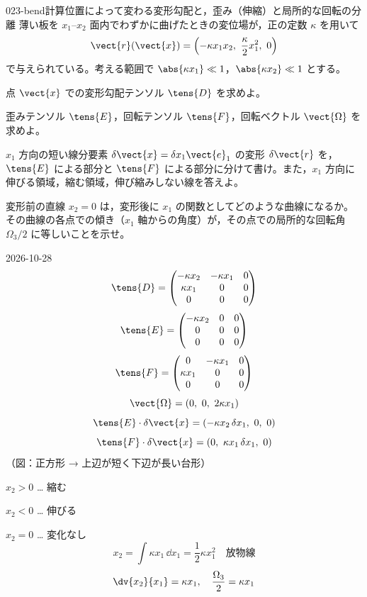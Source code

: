 \documentclass[uplatex,dvipdfmx,a4paper,11pt]{jsarticle}
\begin{document}
\begin{mondai}{023-bend}{計算}{位置によって変わる変形勾配と，歪み（伸縮）と局所的な回転の分離}
薄い板を $x_1$--$x_2$ 面内でわずかに曲げたときの変位場が，正の定数 $\kappa$ を用いて
  \[ \vect{r}(\vect{x})=\left(-\kappa x_1x_2,\ \frac{\kappa}{2}x_1^{2},\ 0\right) \]
  で与えられている。考える範囲で $\abs{\kappa x_1}\ll1$，$\abs{\kappa x_2}\ll1$ とする。
  \begin{shoumon}
    \item 点 $\vect{x}$ での変形勾配テンソル $\tens{D}$ を求めよ。
    \item 歪みテンソル $\tens{E}$，回転テンソル $\tens{F}$，回転ベクトル $\vect{\Omega}$ を求めよ。
    \item $x_1$ 方向の短い線分要素 $\delta\vect{x}=\delta x_1\vect{e}_1$ の変形 $\delta\vect{r}$ を，$\tens{E}$ による部分と $\tens{F}$ による部分に分けて書け。また，$x_1$ 方向に伸びる領域，縮む領域，伸び縮みしない線を答えよ。
    \item 変形前の直線 $x_2=0$ は，変形後に $x_1$ の関数としてどのような曲線になるか。その曲線の各点での傾き（$x_1$ 軸からの角度）が，その点での局所的な回転角 $\Omega_3/2$ に等しいことを示せ。
  \end{shoumon}
\begin{kotaeutsushi}{2026-10-28}
\[ \tens{D}=\begin{pmatrix}-\kappa x_{2}&-\kappa x_{1}&0\\\kappa x_{1}&0&0\\0&0&0\end{pmatrix} \]
\[ \tens{E}=\begin{pmatrix}-\kappa x_{2}&0&0\\0&0&0\\0&0&0\end{pmatrix} \]
\[ \tens{F}=\begin{pmatrix}0&-\kappa x_{1}&0\\\kappa x_{1}&0&0\\0&0&0\end{pmatrix} \]
\[ \vect{\Omega}=(0,\ 0,\ 2\kappa x_{1}) \]
\[ \tens{E}\cdot\delta\vect{x}=(-\kappa x_{2}\,\delta x_{1},\ 0,\ 0) \]
\[ \tens{F}\cdot\delta\vect{x}=(0,\ \kappa x_{1}\,\delta x_{1},\ 0) \]
（図：正方形 → 上辺が短く下辺が長い台形）

$x_{2}>0$ … 縮む

$x_{2}<0$ … 伸びる

$x_{2}=0$ … 変化なし
\[ x_{2}=\int\kappa x_{1}\,\dd x_{1}=\frac{1}{2}\kappa x_{1}^{2}\quad\text{放物線} \]
\[ \dv{x_{2}}{x_{1}}=\kappa x_{1},\quad \frac{\Omega_{3}}{2}=\kappa x_{1} \]
\end{kotaeutsushi}
\end{mondai}
\end{document}
